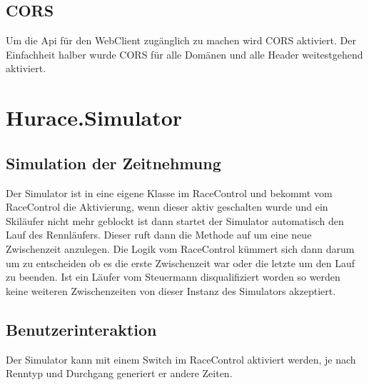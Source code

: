 \documentclass[a4paper, 12pt]{article}
\begin{document}
	\subsection{CORS}
	Um die Api für den WebClient zugänglich zu machen wird CORS aktiviert. Der Einfachheit halber wurde CORS für alle Domänen und alle Header weitestgehend aktiviert.
	
	
	\section{Hurace.Simulator}

	\subsection{Simulation der Zeitnehmung}
	Der Simulator ist in eine eigene Klasse im RaceControl und bekommt vom RaceControl die Aktivierung, wenn dieser aktiv geschalten wurde und ein Skiläufer nicht mehr geblockt ist dann startet der Simulator automatisch den Lauf des Rennläufers. Dieser ruft dann die Methode auf um eine neue Zwischenzeit anzulegen. 
	Die Logik vom RaceControl kümmert sich dann darum um zu entscheiden ob es die erste Zwischenzeit war oder die letzte um den Lauf zu beenden. Ist ein Läufer vom Steuermann disqualifiziert worden so werden keine weiteren Zwischenzeiten von dieser Instanz des Simulators akzeptiert.
	
	\subsection{Benutzerinteraktion}
	Der Simulator kann mit einem Switch im RaceControl aktiviert werden, je nach Renntyp und Durchgang generiert er andere Zeiten.
	
	
\end{document}
